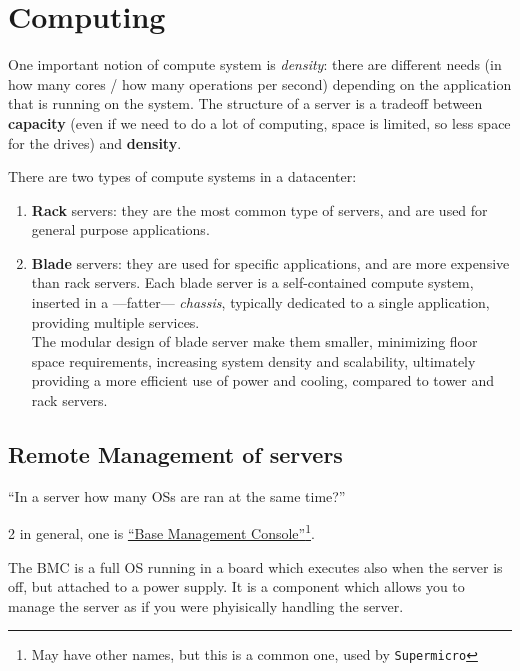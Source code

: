 \chapter{Computing}
One important notion of compute system is \textit{density}: there are different needs (in how many cores / how many operations per second) depending on the application that is running on the system. The structure of a server is a tradeoff between \textbf{capacity} (even if we need to do a lot of computing, space is limited, so less space for the drives) and \textbf{density}.

{
   There are two types of compute systems in a datacenter:\ns
   \begin{enumerate}
   \item \textbf{Rack} servers: they are the most common type of servers, and are used for general purpose applications.
   \item \textbf{Blade} servers: they are used for specific applications, and are more expensive than rack servers.
   Each blade server is a self-contained compute system, inserted in a ---fatter--- \textit{chassis}, typically dedicated to a single application, providing multiple services.\\
   The modular design of blade server make them smaller, minimizing floor space requirements, increasing system density and scalability, ultimately providing a more efficient use of power and cooling, compared to tower and rack servers.
   \end{enumerate}
}

\section{Remote Management of servers}
\begin{center}
   ``In a server how many OSs are ran at the same time?''
\end{center}
2 in general, one is \ul{``Base Management Console''}\footnote{May have other names, but this is a common one, used by \texttt{Supermicro}}.

The BMC is a full OS running in a board which executes also when the server is off, but attached to a power supply. It is a component which allows you to manage the server as if you were phyisically handling the server.


